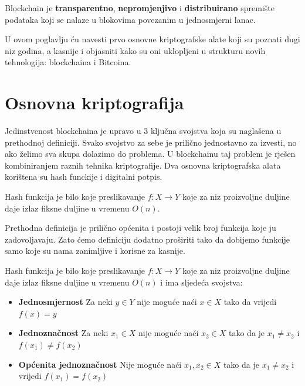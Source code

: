 \documentclass[12pt]{report}
\begin{document}
\begin{definicija}
\label{def:block}
Blockchain je \textbf{transparentno}, \textbf{nepromjenjivo} i \textbf{distribuirano} spremište podataka koji se nalaze u blokovima povezanim u jednosmjerni lanac. 
\end{definicija}

U ovom poglavlju ću navesti prvo osnovne kriptografske alate koji su poznati dugi niz godina, a kasnije i objasniti kako su oni uklopljeni u strukturu novih tehnologija:  blockchaina i Bitcoina.

\section{Osnovna kriptografija}
Jedinstvenost blockchaina je upravo u 3 ključna svojstva koja su naglašena u prethodnoj definiciji. Svako svojstvo za sebe je prilično jednostavno za izvesti, no ako želimo sva skupa dolazimo do problema. U blockchainu taj problem je rješen kombiniranjem raznih tehnika kriptografije. Dva osnovna kriptografska alata korištena su hash funckije i digitalni potpis. 

\begin{definicija} 
Hash funkcija je bilo koje preslikavanje $f\colon X \to Y$ koje za niz proizvoljne duljine daje izlaz fiksne duljine u vremenu $O(n)$. 
\end{definicija}

Prethodna definicija je prilično općenita i postoji velik broj funkcija koje ju zadovoljavaju. Zato ćemo definiciju dodatno proširiti tako da dobijemo funkcije samo koje su nama zanimljive i korisne za kasnije.

\begin{definicija}
Hash funkcija je bilo koje preslikavanje $f\colon X \to Y$ koje za niz proizvoljne duljine daje izlaz fiksne duljine u vremenu $O(n)$ i ima sljedeća svojstva:
\begin{itemize}
    \item \textbf{Jednosmjernost} Za neki $y \in Y$ nije moguće naći $x \in X$ tako da vrijedi $f(x)=y$
    \item \textbf{Jednoznačnost} Za neki $x_{1} \in X$ nije moguće naći $x_{2} \in X$ tako da je $x_{1}\not=x_{2}$ i $f(x_{1}) \not= f(x_{2})$
    \item \textbf{Općenita jednoznačnost} Nije moguće naći $x_{1}, x_{2} \in X$ tako da je $x_{1} \not= x_{2}$ i vrijedi $f(x_{1}) = f(x_{2})$
\end{itemize}
\end{definicija}
\end{document}
